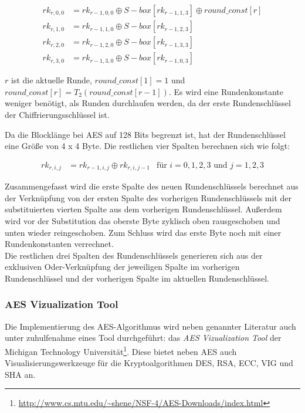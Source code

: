     \begin{equation*}
     \begin{aligned}
     rk_{r,0,0} &= rk_{r-1,0,0} \oplus S-box[rk_{r-1,1,3}] \oplus round\_const[r] \\
     rk_{r,1,0} &= rk_{r-1,1,0} \oplus S-box[rk_{r-1,2,3}] \\
     rk_{r,2,0} &= rk_{r-1,2,0} \oplus S-box[rk_{r-1,3,3}] \\
     rk_{r,3,0} &= rk_{r-1,3,0} \oplus S-box[rk_{r-1,0,3}]
     \end{aligned}
    \end{equation*}
    
   $r$ ist die aktuelle Runde, $round\_const[1] = 1$ und $round\_const[r] = T_2(round\_const[r-1])$. Es wird eine
   Rundenkonstante weniger benötigt, als Runden durchlaufen werden, da der erste Rundenschlüssel der 
   Chiffrierungs\-schlüssel ist.
   
   Da die Blocklänge bei AES auf 128 Bits begrenzt ist, hat der Rundenschlüssel eine Größe von 4 x 4 Byte. Die
   restlichen vier Spalten berechnen sich wie folgt:
   
    \begin{equation*}
     \begin{aligned}
      rk_{r,i,j} &= rk_{r-1,i,j} \oplus rk_{r,i,j-1} &\text{für $i = 0, 1, 2, 3$ und $j = 1, 2, 3$}
     \end{aligned}
    \end{equation*}
    
   Zusammengefasst wird die erste Spalte des neuen Rundenschlüssels berechnet aus der Verknüpfung
   von der ersten Spalte des vorherigen Rundenschlüssels mit der substituierten vierten Spalte aus dem vorherigen
   Rundenschlüssel. Außerdem wird vor der Substitution das oberste Byte zyklisch oben rausgeschoben und unten
   wieder reingeschoben. Zum Schluss wird das erste Byte noch mit einer Rundenkonstanten verrechnet. \\
   Die restlichen drei Spalten des Rundenschlüssels generieren sich aus der exklusiven Oder-Verknüpfung der
   jeweiligen Spalte im vorherigen Rundenschlüssel und der vorherigen Spalte im aktuellen Rundenschlüssel.

   \subsubsection{AES Vizualization Tool}
   Die Implementierung des AES-Algorithmus wird neben genannter Literatur auch unter
   zuhulfenahme eines Tool durchgeführt: das \textit{AES Vizualization Tool} der Michigan
   Technology Universität\footnote{\url{http://www.cs.mtu.edu/~shene/NSF-4/AES-Downloads/index.html}}.
   Diese bietet neben AES auch Visualisierungswerkzeuge für die Kryptoalgorithmen DES, RSA, ECC, VIG
   und SHA an.

